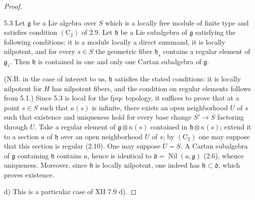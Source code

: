 \begin{proof}
\begin{lemma}{5.3}\label{XIV.5.3}
Let $\mathfrak g$
be a Lie algebra
over $S$ which
is a locally
free module of
finite type and
satisfies condition
$(\mathrm C_2)$
of 2.9. Let
$\mathfrak h$ be
a Lie subalgebra
of $\mathfrak g$
satisfying the
following conditions:
it is a module
locally a direct
summand, it is
locally nilpotent,
and for every
$s\in S$ the
geometric fiber
$\mathfrak h_{\bar s}$
contains a regular
element of
$\mathfrak g_{\bar s}$.
Then $\mathfrak h$
is contained in
one and only one
Cartan subalgebra
of $\mathfrak g$.
\end{lemma}
(N.B. in the
case of interest
to us,
$\mathfrak h$
satisfies the
stated conditions:
it is locally
nilpotent for
$H$ has nilpotent
fibers, and the
condition on regular
elements follows
from 5.1.) Since
5.3 is local
for the fpqc
topology, it
suffices to
prove that at
a point
$s\in S$ such
that $\kappa(s)$
is infinite,
there exists an
open neighborhood
$U$ of $s$
such that
existence and
uniqueness hold
for every base
change $S'\to S$
factoring through
$U$. Take a
regular element
of
$\mathfrak g\otimes\kappa(s)$
contained in
$\mathfrak h\otimes\kappa(s)$;
extend it to
a section $a$
of $\mathfrak h$
over an open
neighborhood $U$
of $s$; by
$(\mathrm C_2)$
one may suppose
that this section
is regular (2.10).
One may suppose
$U=S$. A Cartan
subalgebra of
$\mathfrak g$
containing
$\mathfrak h$
contains $a$,
hence is identical
to
$\mathfrak d=\operatorname{Nil}(a,\mathfrak g)$
(2.6), whence
uniqueness.
Moreover, since
$\mathfrak h$ is
locally nilpotent,
one indeed has
$\mathfrak h\subset\mathfrak d$,
which proves
existence.

\noindent d) This
is a particular
case of XII
7.9 d).
\end{proof}

